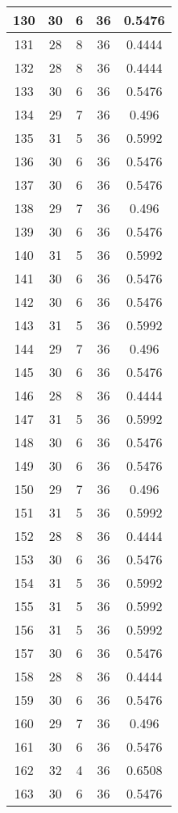 \documentclass[letterpaper, 12pt]{article}
\begin{document}
\begin{longtable}{|c|c|c|c|c|}
\hline
130 & 30 & 6 & 36 & 0.5476 \\
\hline
131 & 28 & 8 & 36 & 0.4444 \\
\hline
132 & 28 & 8 & 36 & 0.4444 \\
\hline
133 & 30 & 6 & 36 & 0.5476 \\
\hline
134 & 29 & 7 & 36 & 0.496 \\
\hline
135 & 31 & 5 & 36 & 0.5992 \\
\hline
136 & 30 & 6 & 36 & 0.5476 \\
\hline
137 & 30 & 6 & 36 & 0.5476 \\
\hline
138 & 29 & 7 & 36 & 0.496 \\
\hline
139 & 30 & 6 & 36 & 0.5476 \\
\hline
140 & 31 & 5 & 36 & 0.5992 \\
\hline
141 & 30 & 6 & 36 & 0.5476 \\
\hline
142 & 30 & 6 & 36 & 0.5476 \\
\hline
143 & 31 & 5 & 36 & 0.5992 \\
\hline
144 & 29 & 7 & 36 & 0.496 \\
\hline
145 & 30 & 6 & 36 & 0.5476 \\
\hline
146 & 28 & 8 & 36 & 0.4444 \\
\hline
147 & 31 & 5 & 36 & 0.5992 \\
\hline
148 & 30 & 6 & 36 & 0.5476 \\
\hline
149 & 30 & 6 & 36 & 0.5476 \\
\hline
150 & 29 & 7 & 36 & 0.496 \\
\hline
151 & 31 & 5 & 36 & 0.5992 \\
\hline
152 & 28 & 8 & 36 & 0.4444 \\
\hline
153 & 30 & 6 & 36 & 0.5476 \\
\hline
154 & 31 & 5 & 36 & 0.5992 \\
\hline
155 & 31 & 5 & 36 & 0.5992 \\
\hline
156 & 31 & 5 & 36 & 0.5992 \\
\hline
157 & 30 & 6 & 36 & 0.5476 \\
\hline
158 & 28 & 8 & 36 & 0.4444 \\
\hline
159 & 30 & 6 & 36 & 0.5476 \\
\hline
160 & 29 & 7 & 36 & 0.496 \\
\hline
161 & 30 & 6 & 36 & 0.5476 \\
\hline
162 & 32 & 4 & 36 & 0.6508 \\
\hline
163 & 30 & 6 & 36 & 0.5476 \\

\end{longtable}
\end{document}
